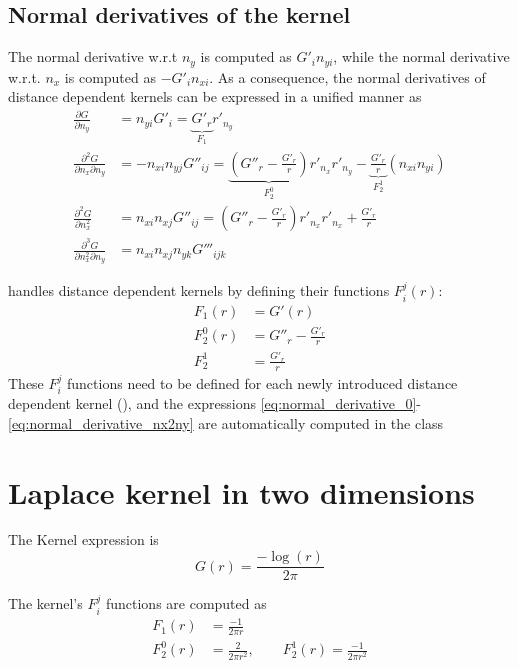 \subsection{Normal derivatives of the kernel}

The normal derivative w.r.t $n_y$ is computed as $G'_i n_{yi}$, while the normal derivative w.r.t. $n_x$ is computed as $-G'_i n_{xi}$.
As a consequence, the normal derivatives of distance dependent kernels can be expressed in a unified manner as
%
\begin{align}
	\frac{\partial G}{\partial n_y} 
	&= n_{yi} G'_i
	= \underbrace{G'_r}_{F_1} r'_{n_y}
	\label{eq:normal_derivative_0}
	\\
	\frac{\partial^2 G}{\partial n_x \partial n_y}
	&= -n_{xi} n_{yj} G''_{ij}
	=  \underbrace{\left(G''_r - \frac{G'_r}{r} \right)}_{F_2^0} r'_{n_x} r'_{n_y} -  \underbrace{\frac{G'_r}{r}}_{F_2^1} \left(n_{xi} n_{yi}\right)
	\\
	\frac{\partial^2 G}{\partial n_x^2}
	&= n_{xi} n_{xj} G''_{ij}
	= \left(G''_r - \frac{G'_r}{r} \right) r'_{n_x} r'_{n_x} +  \frac{G'_r}{r}
	\\
	\frac{\partial^3 G}{\partial n_x^2 \partial n_y}
	&= n_{xi} n_{xj} n_{yk} G'''_{ijk}
	\label{eq:normal_derivative_nx2ny}
\end{align}

\NiHu{} handles distance dependent kernels by defining their functions $F_i^j(r)$:
%
\begin{align}
	F_1(r) &= G'(r) \\
	F_2^0(r) &= G''_r - \frac{G'_r}{r} \\
	F_2^1 &= \frac{G'_r}{r}
\end{align}
%
These $F_i^j$ functions need to be defined for each newly introduced distance dependent kernel (), and the expressions \eqref{eq:normal_derivative_0}-\eqref{eq:normal_derivative_nx2ny} are automatically computed in the class 


\section{Laplace kernel in two dimensions}

The Kernel expression is
%
\begin{equation}
	G(r) = \frac{-\log(r)}{2\pi}
\end{equation}

The kernel's $F_i^j$ functions are computed as
%
\begin{align}
	F_1(r) &= \frac{-1}{2\pi r} \\
	F_2^0(r) &= \frac{2}{2\pi r^2}, \qquad F_2^1(r) = \frac{-1}{2\pi r^2}
\end{align}


